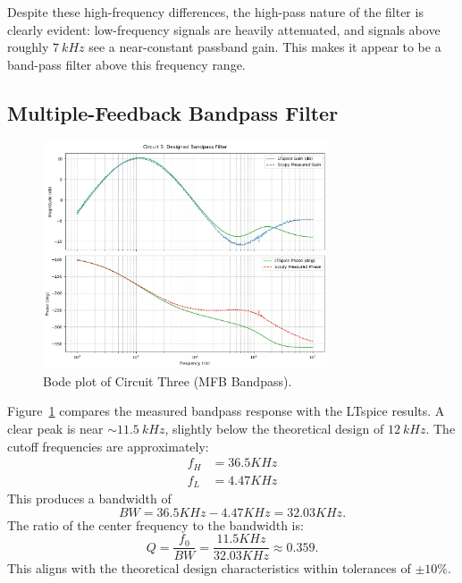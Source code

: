 \documentclass[12pt]{article}
\begin{document}
Despite these high-frequency differences, the high-pass nature of the filter is
clearly evident: low-frequency signals are heavily attenuated, and signals above
roughly $\SI{7}{kHz}$ see a near-constant passband gain. This makes it appear to
be a band-pass filter above this frequency range.

\subsection{Multiple-Feedback Bandpass Filter}

\begin{figure}[H]
	\centering
	\includegraphics[width=0.75\textwidth]{07_bode3}
	\caption{Bode plot of Circuit Three (MFB Bandpass).}
	\label{fig:bode3}
\end{figure}

Figure~\ref{fig:bode3} compares the measured bandpass response with the LTspice
results. A clear peak is near $\sim\SI{11.5}{kHz}$, slightly below
the theoretical design of $\SI{12}{kHz}$.
The cutoff frequencies are approximately:
\begin{align*}
	f_H & = 36.5KHz \\
	f_L & = 4.47KHz
\end{align*}
This produces a bandwidth of
\[
	BW = 36.5KHz - 4.47KHz = 32.03KHz.
\]
The ratio of the center frequency to the bandwidth is:
\[
	Q = \frac{f_0}{BW} = \frac{11.5KHz}{32.03KHz} \approx 0.359.
\]
This aligns with the theoretical design characteristics within tolerances of $\pm{10\%}$.
\end{document}
